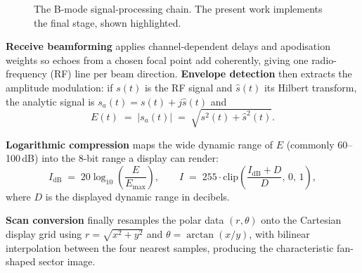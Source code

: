 \documentclass[12pt,a4paper,oneside]{report}
\begin{document}
\begin{figure}[!htbp]
\centering
{}
\caption{The B-mode signal-processing chain. The present work implements the final
stage, shown highlighted.}
\label{fig:chain}
\end{figure}

\textbf{Receive beamforming} applies channel-dependent delays and apodisation
weights so echoes from a chosen focal point add coherently, giving one
radio-frequency (RF) line per beam direction. \textbf{Envelope detection} then
extracts the amplitude modulation: if $s(t)$ is the RF signal and $\hat{s}(t)$ its
Hilbert transform, the analytic signal is $s_a(t)=s(t)+j\hat{s}(t)$ and
\begin{equation}
E(t) \;=\; |s_a(t)| \;=\; \sqrt{s^2(t)+\hat{s}^2(t)}.
\label{eq:envelope}
\end{equation}

\textbf{Logarithmic compression} maps the wide dynamic range of $E$ (commonly
60--100\,dB) into the 8-bit range a display can render:
\begin{equation}
I_{\mathrm{dB}} \;=\; 20\log_{10}\!\left(\frac{E}{E_{\max}}\right),
\qquad
I \;=\; 255 \cdot \mathrm{clip}\!\left(\frac{I_{\mathrm{dB}}+D}{D},\,0,\,1\right),
\label{eq:logcomp}
\end{equation}
where $D$ is the displayed dynamic range in decibels.

\textbf{Scan conversion} finally resamples the polar data $(r,\theta)$ onto the
Cartesian display grid using $r=\sqrt{x^{2}+y^{2}}$ and
$\theta=\arctan(x/y)$, with bilinear interpolation between the four nearest
samples, producing the characteristic fan-shaped sector image.
\end{document}
